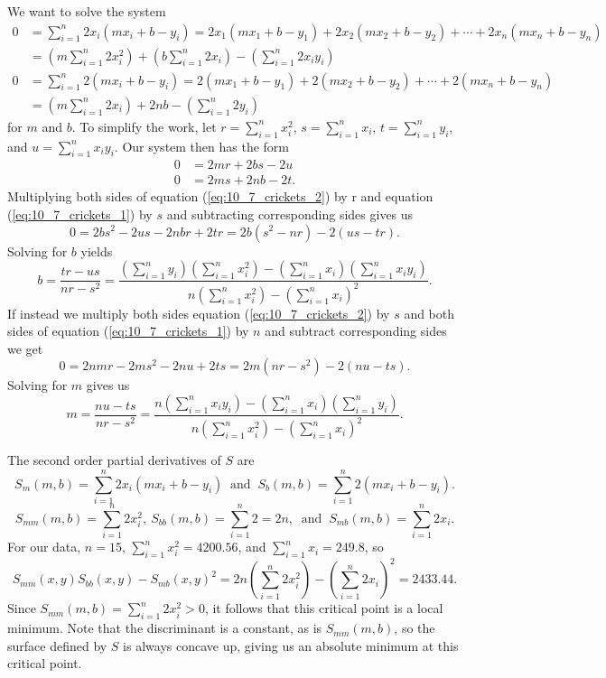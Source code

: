 \begin{exercises}
\begin{exerciseSolution}
\item We want to solve the system  
\begin{align*}
0 &= \sum_{i=1}^n 2x_i(mx_i+b-y_i) = 2x_1(mx_1+b-y_1) + 2x_2(mx_2+b-y_2) + \cdots + 2x_n(mx_n+b-y_n) \\	
	&= \left(m\sum_{i=1}^n 2x_i^2\right) + \left(b \sum_{i=1}^n 2x_i \right) - \left(\sum_{i=1}^n 2x_iy_i \right) \\
0 &= \sum_{i=1}^n 2(mx_i+b-y_i) = 2(mx_1+b-y_1) + 2(mx_2+b-y_2) + \cdots + 2(mx_n+b-y_n) \\
	&= \left(m\sum_{i=1}^n 2x_i\right) + 2nb - \left(\sum_{i=1}^n 2y_i\right)
\end{align*}
for $m$ and $b$. To simplify the work, let $r=\sum_{i=1}^n x_i^2$, $s=\sum_{i=1}^n x_i$, $t = \sum_{i=1}^n y_i$, and $u = \sum_{i=1}^n x_iy_i$. Our system then has the form
\begin{align}
0 &= 2mr + 2bs -2u \label{eq:10_7_crickets_1} \\
0 &= 2ms + 2nb - 2t. \label{eq:10_7_crickets_2}
\end{align}
Multiplying both sides of equation (\ref{eq:10_7_crickets_2}) by r and equation (\ref{eq:10_7_crickets_1}) by $s$ and subtracting corresponding sides gives us 
\[0 = 2bs^2-2us-2nbr+2tr = 2b(s^2-nr) - 2(us-tr).\]
Solving for $b$ yields
\[b = \frac{tr-us}{nr-s^2} = \frac{\left(\sum_{i=1}^n y_i\right) \left(\sum_{i=1}^n x_i^2\right) - \left(\sum_{i=1}^n x_i \right) \left(\sum_{i=1}^n x_iy_i \right)}{n\left(\sum_{i=1}^n x_i^2 \right) - \left(\sum_{i=1}^n x_i \right)^2}.\]
If instead we multiply both sides equation (\ref{eq:10_7_crickets_2}) by $s$ and both sides of equation (\ref{eq:10_7_crickets_1}) by $n$ and subtract corresponding sides we get 
\[0 = 2nmr-2ms^2-2nu+2ts = 2m(nr-s^2)-2(nu-ts).\]
 Solving for $m$ gives us 
\[m=\frac{nu-ts}{nr-s^2} = \frac{n\left(\sum_{i=1}^n x_iy_i\right) - \left(\sum_{i=1}^n x_i \right) \left(\sum_{i=1}^n y_i \right)}{n\left(\sum_{i=1}^n x_i^2 \right) - \left(\sum_{i=1}^n x_i \right)^2}.\]


\item The second order partial derivatives of $S$ are 
\[S_m(m,b) =  \sum_{i=1}^n 2x_i(mx_i+b-y_i) \ \text{ and } \ S_b(m,b) = \sum_{i=1}^n 2(mx_i+b-y_i).\]
\[S_{mm}(m,b) = \sum_{i=1}^n 2x_i^2, \ S_{bb}(m,b) = \sum_{i=1}^n 2 = 2n, \ \text{ and } \ S_{mb}(m,b) = \sum_{i=1}^n 2x_i.\]
For our data, $n=15$, $\sum_{i=1}^n x_i^2 = 4200.56$, and $\sum_{i=1}^n x_i = 249.8$, so 
\[S_{mm}(x,y)S_{bb}(x,y) - S_{mb}(x,y)^2 = 2n\left(\sum_{i=1}^n 2x_i^2\right)- \left(\sum_{i=1}^n 2x_i\right)^2 = 2433.44.\]
Since $S_{mm}(m,b) = \sum_{i=1}^n 2x_i^2 > 0$, it follows that this critical point is a local minimum. Note that the discriminant is a constant, as is $S_{mm}(m,b)$, so the surface defined by $S$ is always concave up, giving us an absolute minimum at this critical point. 
 

\end{exerciseSolution}
\end{exercises}
